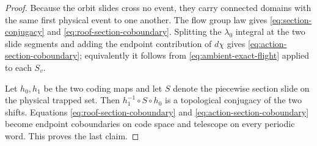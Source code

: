 \documentclass[11pt]{amsart}
\numberwithin{equation}{section}
\theoremstyle{definition}
\theoremstyle{remark}
\begin{document}
\begin{proof}
Because the orbit slides cross no event, they carry connected domains with
the same first physical event to one another.  The flow group law gives
\eqref{eq:section-conjugacy} and
\eqref{eq:roof-section-coboundary}.  Splitting the $\lambda_0$ integral at
the two slide segments and adding the endpoint contribution of $d\chi$
gives \eqref{eq:action-section-coboundary}; equivalently it follows from
\eqref{eq:ambient-exact-flight} applied to each $S_v$.

Let $h_0,h_1$ be the two coding maps and let $S$ denote the piecewise
section slide on the physical trapped set.  Then
$h_1^{-1}\circ S\circ h_0$ is a topological conjugacy of the two shifts.
Equations \eqref{eq:roof-section-coboundary} and
\eqref{eq:action-section-coboundary} become endpoint coboundaries on code
space and telescope on every periodic word.  This proves the last claim.
\end{proof}
\end{document}
